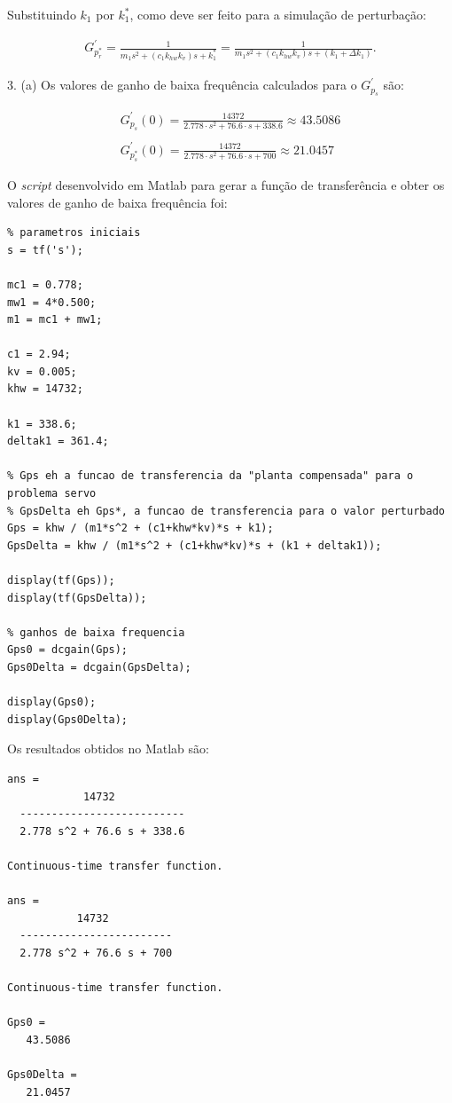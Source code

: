 \documentclass[a4paper,11pt]{article}
\begin{document}
Substituindo $k_1$ por $k_1^\ast$, como deve ser feito para a simulação de
perturbação:

\begin{gather*}
    G^\prime_{p_r^\ast} =
         \frac{1}{m_1s^2 + \left( c_1 k_{hw} k_v \right) s + k_1^\ast} =
         \frac{1}{m_1s^2 + \left( c_1 k_{hw} k_v \right) s +
         \left( k_1 + \Delta k_1 \right)}.
\end{gather*}

\newpage

3. (a) Os valores de ganho de baixa frequência calculados para o $G^\prime_{p_s}$ são:

\begin{gather*}
    G^\prime_{p_s} \left( 0 \right) = \frac{14372}{2.778 \cdot s^2 + 76.6 \cdot
      s + 338.6} \approx 43.5086 \\ \\
    G^\prime_{p_s^\ast} \left( 0 \right) = \frac{14372}{2.778 \cdot s^2 + 76.6
      \cdot s + 700} \approx 21.0457
\end{gather*}

O \textit{script} desenvolvido em Matlab para gerar a função de transferência e
obter os valores de ganho de baixa frequência foi:

\begin{lstlisting}
% parametros iniciais
s = tf('s');

mc1 = 0.778;
mw1 = 4*0.500;
m1 = mc1 + mw1;

c1 = 2.94;
kv = 0.005;
khw = 14732;

k1 = 338.6;
deltak1 = 361.4;

% Gps eh a funcao de transferencia da "planta compensada" para o problema servo
% GpsDelta eh Gps*, a funcao de transferencia para o valor perturbado
Gps = khw / (m1*s^2 + (c1+khw*kv)*s + k1);
GpsDelta = khw / (m1*s^2 + (c1+khw*kv)*s + (k1 + deltak1));

display(tf(Gps));
display(tf(GpsDelta));

% ganhos de baixa frequencia
Gps0 = dcgain(Gps);
Gps0Delta = dcgain(GpsDelta);

display(Gps0);
display(Gps0Delta);
\end{lstlisting}

Os resultados obtidos no Matlab são:

\begin{lstlisting}
ans =
            14732
  --------------------------
  2.778 s^2 + 76.6 s + 338.6
 
Continuous-time transfer function.

ans =
           14732
  ------------------------
  2.778 s^2 + 76.6 s + 700
 
Continuous-time transfer function.

Gps0 =
   43.5086

Gps0Delta =
   21.0457
\end{lstlisting}
\end{document}
